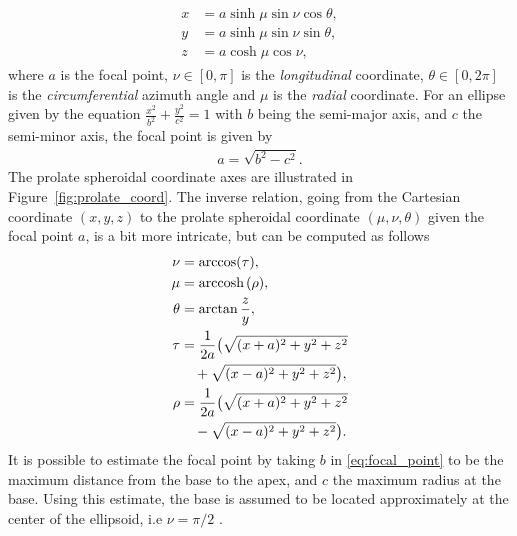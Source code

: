 \begin{align}
  \begin{split}
    x &= a \sinh \mu \sin \nu \cos \theta,  \\
    y &= a \sinh \mu \sin \nu \sin \theta,  \\
    z &= a \cosh \mu \cos \nu,
  \end{split}
\end{align}
where $a$ is the focal point, $\nu \in [0, \pi]$ is the \emph{longitudinal}
coordinate, $\theta \in [0, 2\pi]$ is the \emph{circumferential} azimuth angle and $\mu$
is the \emph{radial} coordinate. For an ellipse given by the equation
$\frac{x^2}{b^2} +\frac{y^2}{c^2}  = 1$ with $b$ being the semi-major
axis, and $c$ the semi-minor axis, the focal point is given by
\begin{align}
  a =\sqrt{b^2 - c^2}.
  \label{eq:focal_point}
\end{align}
The prolate spheroidal coordinate axes are illustrated in
Figure~\ref{fig:prolate_coord}. The inverse relation, going from the
Cartesian coordinate $(x,y,z)$ to the prolate spheroidal coordinate
$(\mu, \nu, \theta)$ given the focal point $a$, is a bit more
intricate, but can be computed as follows 
\begin{align}
  \begin{split}
    \nu &= \arccos (\tau), \\
    \mu &= \mathrm{arccosh} \hspace{0.05cm} (\rho), \\
    \theta &= \arctan \frac{z}{y}, \\
    \tau &= \frac{1}{2a} \big( \sqrt{(x + a)^2 + y^2 + z^2} \\
    & \quad + \sqrt{(x - a)^2 + y^2 + z^2} \big), \\
    \rho &= \frac{1}{2a} \big( \sqrt{(x + a)^2 + y^2 + z^2}\\
    & \quad - \sqrt{(x - a)^2 + y^2 + z^2}\big). 
  \end{split}
\end{align}
It is possible to estimate the focal point by taking $b$ in
\eqref{eq:focal_point} to be the maximum distance from the base to the
apex, and $c$ the maximum radius at the base. Using this estimate,
the base is assumed to be located approximately at the center of the
ellipsoid, i.e $\nu = \pi / 2$ \cite{land2015verification}.
